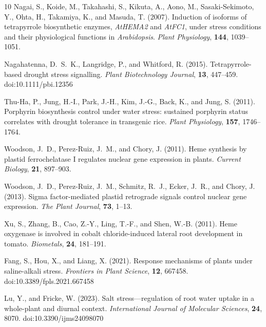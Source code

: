 \documentclass[unnumsec,webpdf,contemporary,large]{oup-authoring-template}%
\theoremstyle{thmstyleone}%
\theoremstyle{thmstyletwo}%
\theoremstyle{thmstylethree}%
\begin{document}
\begin{thebibliography}{10}
Nagai, S., Koide, M., Takahashi, S., Kikuta, A., Aono, M., Sasaki-Sekimoto, Y., Ohta, H., Takamiya, K., and Masuda, T. (2007).
Induction of isoforms of tetrapyrrole biosynthetic enzymes, \textit{AtHEMA2} and \textit{AtFC1}, under stress conditions and their physiological functions in \textit{Arabidopsis}.
\textit{Plant Physiology}, \textbf{144}, 1039--1051.

Nagahatenna, D.~S.~K., Langridge, P., and Whitford, R. (2015).
Tetrapyrrole-based drought stress signalling.
\textit{Plant Biotechnology Journal}, \textbf{13}, 447--459.
doi:10.1111/pbi.12356

Thu-Ha, P., Jung, H.-I., Park, J.-H., Kim, J.-G., Back, K., and Jung, S. (2011).
Porphyrin biosynthesis control under water stress: sustained porphyrin status correlates with drought tolerance in transgenic rice.
\textit{Plant Physiology}, \textbf{157}, 1746--1764.

Woodson, J.~D., Perez-Ruiz, J.~M., and Chory, J. (2011).
Heme synthesis by plastid ferrochelatase I regulates nuclear gene expression in plants.
\textit{Current Biology}, \textbf{21}, 897--903.

Woodson, J.~D., Perez-Ruiz, J.~M., Schmitz, R.~J., Ecker, J.~R., and Chory, J. (2013).
Sigma factor-mediated plastid retrograde signals control nuclear gene expression.
\textit{The Plant Journal}, \textbf{73}, 1--13.

Xu, S., Zhang, B., Cao, Z.-Y., Ling, T.-F., and Shen, W.-B. (2011).
Heme oxygenase is involved in cobalt chloride-induced lateral root development in tomato.
\textit{Biometals}, \textbf{24}, 181--191.


Fang, S., Hou, X., and Liang, X. (2021).
Response mechanisms of plants under saline-alkali stress.
\textit{Frontiers in Plant Science}, \textbf{12}, 667458.
doi:10.3389/fpls.2021.667458

Lu, Y., and Fricke, W. (2023).
Salt stress---regulation of root water uptake in a whole-plant and diurnal context.
\textit{International Journal of Molecular Sciences}, \textbf{24}, 8070.
doi:10.3390/ijms24098070


\end{thebibliography}
\end{document}
